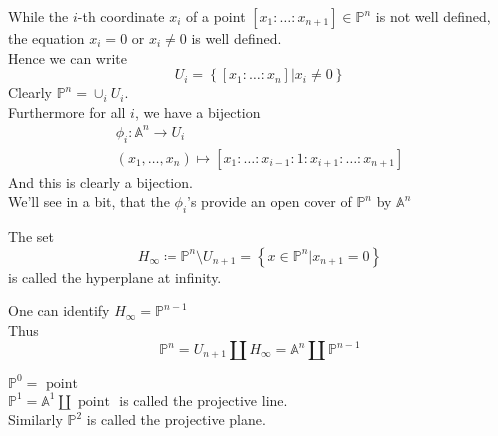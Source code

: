 \documentclass[../main.tex]{subfiles}
\begin{document}
While the $i$-th coordinate $x_i$ of a point $ [ x_1: \ldots:x_{n+1} ] \in \mathbb{P}^{n}$ is not well defined, the equation $x_i=0$ or $x_i\neq 0$  is well defined.\\
Hence we can write
\[ 
U_i = \left\{ [ x_1:\ldots:x_n] |x_i\neq 0 \right\} 
\]
Clearly $ \mathbb{P}^{n}=\cup_i U_i$.\\
Furthermore for all $i$, we have a bijection
\begin{align*}
\phi_i: \mathbb{A}^{n}\to U_i\\
( x_1,\ldots,x_n) \mapsto [ x_1:\ldots:x_{i-1}:1 : x_{i+1} :\ldots: x_{n+1}  ] 
\end{align*}
And this is clearly a bijection.\\
We'll see in a bit, that the $\phi_i$'s provide an open cover of $ \mathbb{P}^{n}$ by $ \mathbb{A}^{n}$ 
\begin{defn}
	The set 
	\[ 
	H_{ \infty } \coloneqq  \mathbb{P}^{n}\setminus U_{n+1} = \left\{ x\in \mathbb{P}^{n}| x_{n+1} =0 \right\} 
	\]
	is called the hyperplane at infinity.
\end{defn}
One can identify $ H_{ \infty } = \mathbb{P}^{n-1}$\\
Thus
\[ 
\mathbb{P}^{n}= U_{n+1} \coprod H_{ \infty } = \mathbb{A}^{n}\coprod \mathbb{P}^{n-1}
\]
\begin{exemple}
$ \mathbb{P}^{0}= \text{ point } $ \\
$ \mathbb{P}^{1}= \mathbb{A}^{1}\coprod \text{ point } $ is called the projective line.\\
Similarly $ \mathbb{P}^{2}$ is called the projective plane.
\end{exemple}
\end{document}
